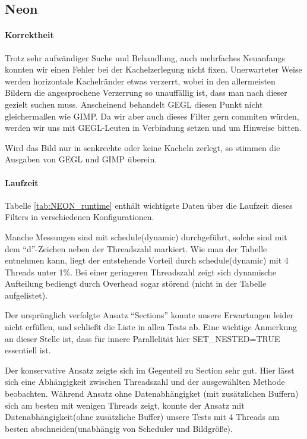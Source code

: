 \newpage
\subsection{Neon}
\paragraph{Korrektheit}
\label{paragraph:neon_korrektheit}
Trotz sehr aufwändiger Suche und Behandlung, auch mehrfaches Neuanfangs konnten wir einen Fehler bei der Kachelzerlegung nicht fixen.  
Unerwarteter Weise werden horizontale Kachelränder etwas verzerrt, wobei in den allermeisten Bildern die angesprochene Verzerrung so unauffällig ist, dass man nach dieser gezielt suchen muss.
Anscheinend behandelt GEGL diesen Punkt nicht gleichermaßen wie GIMP.
Da wir aber auch dieses Filter gern commiten würden, werden wir uns mit GEGL-Leuten in Verbindung setzen und um Hinweise bitten.

Wird das Bild nur in senkrechte oder keine Kacheln zerlegt, so stimmen die Ausgaben von GEGL und GIMP überein.
\paragraph{Laufzeit}
Tabelle \ref{tab:NEON_runtime} enthält wichtigste Daten über die Laufzeit dieses Filters in verschiedenen Konfigurationen. 

Manche Messungen sind mit schedule(dynamic) durchgeführt, solche sind mit dem ``d''-Zeichen neben der Threadszahl markiert. Wie man der Tabelle entnehmen kann, liegt der entstehende Vorteil durch schedule(dynamic) mit 4 Threads unter 1\%. Bei einer geringeren Threadszahl zeigt sich dynamische Aufteilung bediengt durch Overhead sogar störend (nicht in der Tabelle aufgelistet).

Der ursprünglich verfolgte Ansatz ``Sections'' konnte  unsere Erwartungen leider nicht erfüllen, und schließt die Liste in allen Tests ab. Eine wichtige Anmerkung an dieser Stelle ist, dass für innere Parallelität hier SET\_NESTED=TRUE essentiell ist.

Der konservative Ansatz zeigte sich im Gegenteil zu Section sehr gut. Hier lässt sich eine Abhängigkeit zwischen Threadszahl und der ausgewählten Methode beobachten. Während Ansatz ohne Datenabhängigket (mit zusätzlichen Buffern) sich am besten mit wenigen Threads zeigt, konnte der Ansatz mit Datenabhängigkeit(ohne zusätzliche Buffer) unsere Tests mit 4 Threads am besten abschneiden(unabhängig von Scheduler und Bildgröße).


